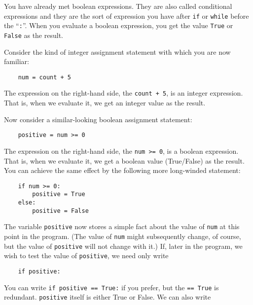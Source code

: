 You have already met boolean expressions.  They are also called conditional
expressions and they are the sort of expression you have
after \texttt{if} or \texttt{while} before the ``\texttt{:}''.
When you evaluate a boolean expression,
you get the value \texttt{True} or \texttt{False} as the result.

Consider the kind of integer assignment statement with which you are
now familiar:

\begin{Verbatim}
    num = count + 5
\end{Verbatim}

The expression on the right-hand side, the \texttt{count + 5}, is an
integer expression.  That is, when we evaluate it, we get an integer value
as the result.

Now consider a similar-looking boolean assignment statement:

\begin{Verbatim}
    positive = num >= 0
\end{Verbatim}

The expression on the right-hand side, the \texttt{num >= 0}, is a
boolean expression.  That is, when we evaluate it, we get a boolean value
(True/False) as the result.
You can achieve
the same effect by the following more long-winded statement:

\begin{Verbatim}
    if num >= 0:
        positive = True
    else:
        positive = False
\end{Verbatim}

\pagebreak

The variable \texttt{positive} now stores a simple fact about the value of
 \texttt{num} at this point in the program.  (The value of  \texttt{num} might
subsequently change, of course, but the value of \texttt{positive} will not
change with it.)  If, later in the program, we wish to test
the value of \texttt{positive}, we need only write

\begin{Verbatim}
    if positive:
\end{Verbatim}

You can write \texttt{if positive == True:} if you prefer, but the
\texttt{== True} 
is redundant.  \texttt{positive} itself is either True or False.  
We can also write

